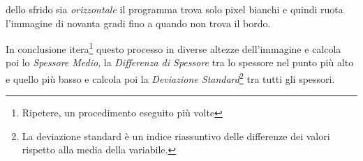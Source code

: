 \documentclass[a4paper, notitlepage, 12pt]{article}
\begin{document}
    dello sfrido sia \emph{orizzontale} il programma trova solo pixel bianchi e quindi ruota l'immagine di novanta gradi fino a quando
    non trova il bordo.\par
    \pagebreak
    \noindent In conclusione itera\footnote[7]{\indent Ripetere, un procedimento eseguito più volte} questo processo in diverse altezze dell'immagine e calcola poi lo \emph{Spessore Medio}, la \emph{Differenza di Spessore} tra 
    lo spessore nel punto più alto e quello più basso e calcola poi la \emph{Deviazione Standard}\footnote[8]{\indent La deviazione standard è un indice riassuntivo delle differenze dei valori rispetto alla media della variabile.} tra tutti gli spessori.
    \begin{abstract}
        \noindent \rule{\linewidth}{.6pt}\par
        
        \noindent \rule{\linewidth}{.6pt} 
    \end{abstract}
    \thispagestyle{plain} 
\end{document}
